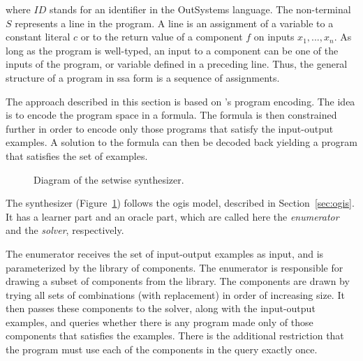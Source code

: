 \noindent
where $ID$ stands for an identifier in the OutSystems language. The non-terminal
$S$ represents a line in the program. A line is an assignment of a variable to a
constant literal $c$ or to the return value of a component $f$ on inputs $x_1,
..., x_n$. As long as the program is well-typed, an input to a component can
be one of the inputs of the program, or variable defined in a preceding line.
Thus, the general structure of a program in \gls{ssa} form is a sequence of
assignments.

The approach described in this section is based on
\citeauthor{Jha:oracle:2010}'s program encoding. The idea is to encode the
program space in a formula. The formula is then constrained further in order to
encode only those programs that satisfy the input-output examples. A solution to
the formula can then be decoded back yielding a program that satisfies the set
of examples.

\begin{figure}
  \centering

  \caption{Diagram of the setwise synthesizer.}
  \label{fig:synth-setwise}
\end{figure}

The synthesizer (Figure~\ref{fig:synth-setwise}) follows the \gls{ogis} model,
described in Section~\ref{sec:ogis}. It has a learner part and an oracle part,
which are called here the \textit{enumerator} and the \textit{solver},
respectively.

The enumerator receives the set of input-output examples as input, and is
parameterized by the library of components. The enumerator is responsible for
drawing a subset of components from the library. The components are drawn by
trying all sets of combinations (with replacement) in order of increasing size.
It then passes these components to the solver, along with the input-output
examples, and queries whether there is any program made only of those components
that satisfies the examples. There is the additional restriction that the
program must use each of the components in the query exactly once.

